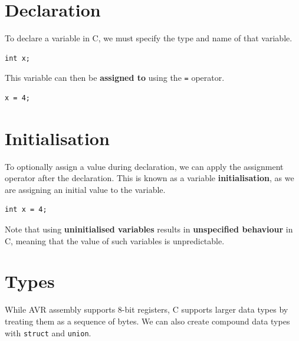 \documentclass[a4paper]{report}
\begin{document}
\section{Declaration}
To declare a variable in C, we must specify the type and name of that variable.
\begin{verbatim}
int x;
\end{verbatim}
This variable can then be \textbf{assigned to} using the \texttt{=} operator.
\begin{verbatim}
x = 4;
\end{verbatim}
\section{Initialisation}
To optionally assign a value during declaration, we can apply the assignment operator after
the declaration. This is known as a variable \textbf{initialisation}, as we are assigning an initial value to the variable.
\begin{verbatim}
int x = 4;
\end{verbatim}
Note that using \textbf{uninitialised variables} results in \textbf{unspecified behaviour} in C, meaning that
the value of such variables is unpredictable.
\section{Types}
While AVR assembly supports 8-bit registers, C supports larger data types by treating them as a sequence of bytes.
We can also create compound data types with \texttt{struct} and \texttt{union}.
\end{document}
